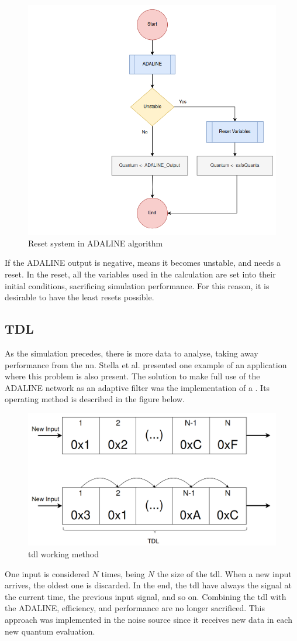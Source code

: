 \begin{figure}[H]
	\centering
 	\includegraphics[width=0.5\linewidth]{Images/ResetSystemADALINE.png}
 	\caption{Reset system in ADALINE algorithm}
	 \label{fig_ResetSystemADALINE}
\end{figure}

If the ADALINE output is negative, means it becomes unstable, and needs a reset. In the reset, all the variables used in the calculation are set into their initial conditions, sacrificing simulation performance. For this reason, it is desirable to have the least resets possible.

\subsection{TDL}

As the simulation precedes, there is more data to analyse, taking away performance from the \gls{nn}. Stella et al. \cite{noiseCancelingADALINE} presented one example of an application where this problem is also present. The solution to make full use of the ADALINE network as an adaptive filter was the implementation of a . Its operating method is described in the figure below. 

\begin{figure}[H]
	\centering
 	\includegraphics[width=0.5\linewidth]{Images/TDL.png}
 	\caption{\gls{tdl} working method}
	 \label{fig_TDL}
\end{figure}

One input is considered $N$ times, being $N$ the size of the \gls{tdl}. When a new input arrives, the oldest one is discarded. In the end, the \gls{tdl} have always the signal at the current time, the previous input signal, and so on. Combining the \gls{tdl} with the ADALINE, efficiency, and performance are no longer sacrificed. This approach was implemented in the noise source since it receives new data in each new quantum evaluation. 

